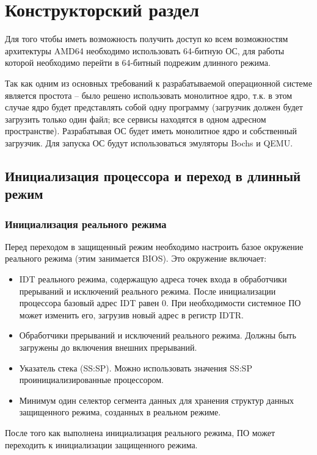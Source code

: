 \chapter{Конструкторский раздел}
\label{cha:design}

Для того чтобы иметь возможность получить доступ ко всем возможностям архитектуры AMD64
необходимо использовать 64-битную ОС, для работы которой необходимо перейти в 64-битный
подрежим длинного режима.

Так как одним из основных требований к разрабатываемой операционной системе
является простота -- было решено использовать монолитное ядро, т.к. в этом
случае ядро будет представлять собой одну программу (загрузчик должен
будет загрузить только один файл; все сервисы находятся в одном адресном
пространстве). Разрабатывая ОС будет иметь монолитное ядро и собственный
загрузчик. Для запуска ОС будут использоваться эмуляторы Bochs и QEMU.



\section{Инициализация процессора и переход в длинный режим}
\label{sec:long_mode_activation}

\subsection{Инициализация реального режима}
Перед переходом в защищенный режим необходимо настроить базое окружение
реального режима (этим занимается BIOS). Это окружение включает:
\begin{itemize}
\item IDT реального режима, содержащую адреса точек входа в обработчики прерываний
	и исключений реального режима. После инициализации процессора базовый адрес IDT
	равен 0. При необходимости системное ПО может изменить его, загрузив новый адрес
	в регистр IDTR.
\item Обработчики прерываний и исключений реального режима. Должны быть загружены до
	включения внешних прерываний.
\item Указатель стека (SS:SP). Можно использовать значения SS:SP проинициализированные процессором.
\item Минимум один селектор сегмента данных для хранения структур данных защищенного режима,
	созданных в реальном режиме.
\end{itemize}

После того как выполнена инициализация реального режима, ПО может переходить к
инициализации защищенного режима.

